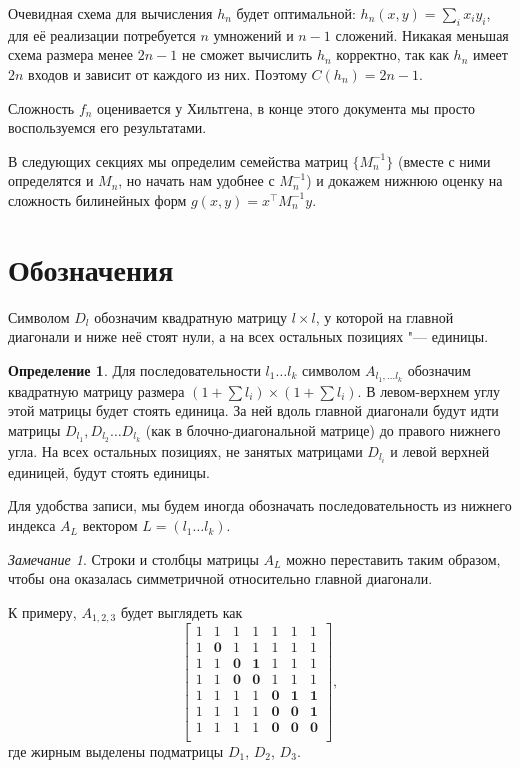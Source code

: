 \documentclass[oneside, a4paper]{article}
\theoremstyle{definition}
\newtheorem{definition}{Определение}
\theoremstyle{remark}
\newtheorem{remark}{Замечание}
\begin{document}
Очевидная схема для вычисления $h_n$ будет оптимальной: $h_n(x, y) = \sum_i x_i
y_i$, для её реализации потребуется $n$ умножений и $n - 1$ сложений. Никакая
меньшая схема размера менее $2n - 1$ не сможет вычислить $h_n$ корректно, так
как $h_n$ имеет $2n$ входов и зависит от каждого из них. Поэтому $C(h_n) = 2n - 1$.

Сложность $f_n$ оценивается у Хильтгена, в конце этого документа мы просто
воспользуемся его результатами.

В следующих секциях мы определим семейства матриц $\{M_n^{-1}\}$ (вместе с ними
определятся и $M_n$, но начать нам удобнее с $M_n^{-1}$) и докажем нижнюю оценку
на сложность билинейных форм $g(x, y) = x^\top M_n^{-1} y$.

\section{Обозначения}


Символом $D_l$ обозначим квадратную матрицу $l \times l$, у которой на главной
диагонали и ниже неё стоят нули, а на всех остальных позициях "--- единицы.

\begin{definition}
Для последовательности $l_1 \dots l_k$ символом $A_{l_1, \dots l_k}$ обозначим
квадратную матрицу размера $(1 + \sum l_i) \times (1 + \sum l_i)$. В левом-верхнем
углу этой матрицы будет стоять единица. За ней вдоль главной диагонали будут идти
матрицы $D_{l_1}, D_{l_2} \dots D_{l_k}$ (как в блочно-диагональной матрице) до
правого нижнего угла. На всех остальных позициях, не занятых матрицами $D_{l_i}$
и левой верхней единицей, будут стоять единицы.
\end{definition}

Для удобства записи, мы будем иногда обозначать последовательность из нижнего
индекса $A_L$ вектором $L = (l_1 \dots l_k)$.

\begin{remark}
Строки и столбцы матрицы $A_L$ можно переставить таким образом, чтобы она
оказалась симметричной относительно главной диагонали.
\end{remark}

К примеру, $A_{1, 2, 3}$ будет выглядеть как
\[
\begin{bmatrix}
1 & 1 & 1 & 1 & 1 & 1 & 1 \\
1 & \mathbf{0} & 1 & 1 & 1 & 1 & 1 \\
1 & 1 & \mathbf{0} & \mathbf{1} & 1 & 1 & 1 \\
1 & 1 & \mathbf{0} & \mathbf{0} & 1 & 1 & 1 \\
1 & 1 & 1 & 1 & \mathbf{0} & \mathbf{1} & \mathbf{1} \\
1 & 1 & 1 & 1 & \mathbf{0} & \mathbf{0} & \mathbf{1} \\
1 & 1 & 1 & 1 & \mathbf{0} & \mathbf{0} & \mathbf{0} \\
\end{bmatrix},
\]
где жирным выделены подматрицы $D_1$, $D_2$, $D_3$.
\end{document}
